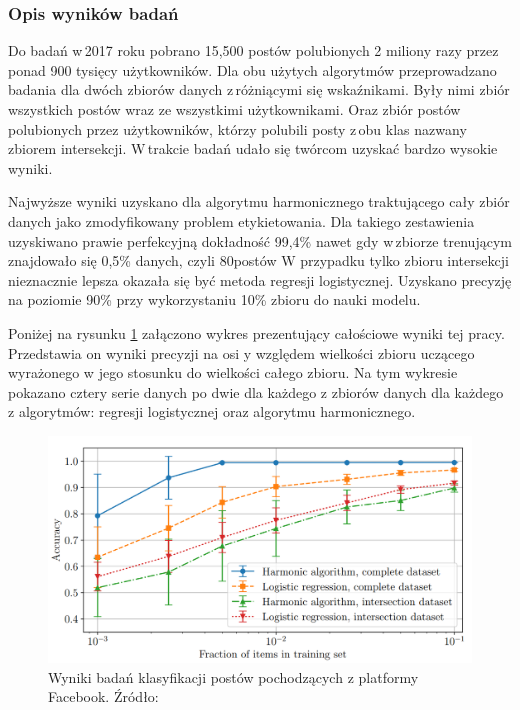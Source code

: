 \subsubsection{Opis wyników badań}
Do badań w\,2017 roku pobrano 15,500 postów polubionych 2 miliony razy przez ponad 900 tysięcy użytkowników. Dla obu użytych algorytmów przeprowadzano badania dla dwóch zbiorów danych z\,różniącymi się wskaźnikami. Były nimi zbiór wszystkich postów wraz ze wszystkimi użytkownikami. Oraz zbiór postów polubionych przez użytkowników, którzy polubili posty z\,obu klas nazwany zbiorem intersekcji. W\,trakcie badań udało się twórcom uzyskać bardzo wysokie wyniki. 
\par
Najwyższe wyniki uzyskano dla algorytmu harmonicznego traktującego cały zbiór danych jako zmodyfikowany problem etykietowania. Dla takiego zestawienia uzyskiwano prawie perfekcyjną dokładność 99,4\% nawet gdy w\,zbiorze trenującym znajdowało się 0,5\% danych, czyli 80postów
W przypadku tylko zbioru intersekcji nieznacznie lepsza okazała się być metoda regresji logistycznej. Uzyskano precyzję na poziomie 90\% przy wykorzystaniu 10\% zbioru do nauki modelu. 
\par 
Poniżej na rysunku \ref{fig:wyniki-somelikeithoax} załączono wykres prezentujący całościowe wyniki tej pracy. Przedstawia on wyniki precyzji na osi y względem wielkości zbioru uczącego wyrażonego w jego stosunku do wielkości całego zbioru. Na tym wykresie pokazano cztery serie danych po dwie dla każdego z zbiorów danych dla każdego z algorytmów: regresji logistycznej oraz algorytmu harmonicznego.

\begin{figure}[!h]
	
	\centering \includegraphics[width=0.9\linewidth]{img/results/wyniki-somelikeithoax.png}
	\caption{Wyniki badań klasyfikacji postów pochodzących z platformy Facebook. Źródło:\cite{tacchini2017some}}\label{fig:wyniki-somelikeithoax}
\end{figure}
